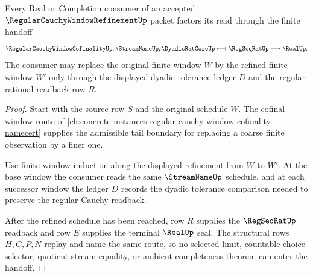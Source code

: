 \begin{theorem}
\label{thm:regular-cauchy-window-refinement-cofinal-handoff}
Every Real or Completion consumer of an accepted $\RegularCauchyWindowRefinementUp$ packet factors its read through the finite handoff
$$
\RegularCauchyWindowCofinalityUp,\StreamNameUp,\DyadicRatCoreUp
\longmapsto \RegSeqRatUp
\longmapsto \RealUp .
$$
The consumer may replace the original finite window $W$ by the refined finite window $W'$ only through the displayed dyadic tolerance ledger $D$ and the regular rational readback row $R$.
\end{theorem}
\begin{proof}
Start with the source row $S$ and the original schedule $W$. The cofinal-window route of \autoref{ch:concrete-instances-regular-cauchy-window-cofinality-namecert} supplies the admissible tail boundary for replacing a coarse finite observation by a finer one.

Use finite-window induction along the displayed refinement from $W$ to $W'$. At the base window the consumer reads the same $\StreamNameUp$ schedule, and at each successor window the ledger $D$ records the dyadic tolerance comparison needed to preserve the regular-Cauchy readback.

After the refined schedule has been reached, row $R$ supplies the $\RegSeqRatUp$ readback and row $E$ supplies the terminal $\RealUp$ seal. The structural rows $H,C,P,N$ replay and name the same route, so no selected limit, countable-choice selector, quotient stream equality, or ambient completeness theorem can enter the handoff.
\end{proof}



